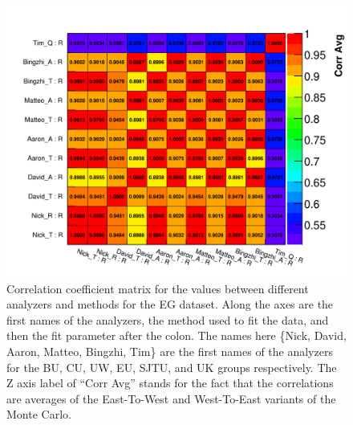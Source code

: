 \begin{figure}[]
\centering
\includegraphics[width=\textwidth]{Avg_CorrelationMatrix_R_R}
\caption{Correlation coefficient matrix for the \R values between different analyzers and methods for the EG dataset. Along the axes are the first names of the analyzers, the method used to fit the data, and then the fit parameter after the colon. The names here \{Nick, David, Aaron, Matteo, Bingzhi, Tim\} are the first names of the analyzers for the BU, CU, UW, EU, SJTU, and UK groups respectively. The Z axis label of ``Corr Avg'' stands for the fact that the correlations are averages of the East-To-West and West-To-East variants of the Monte Carlo.}
\label{fig:corrMatAnalyzer}
\end{figure}

